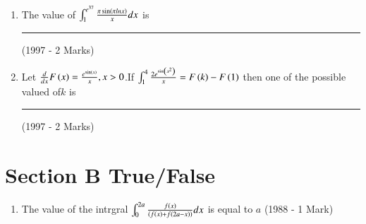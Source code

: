 \documentclass[journal,12pt,twocolumn]{IEEEtran}
\theoremstyle{remark}
\begin{document}
\begin{enumerate}
\item The value of $\int_1^{e^{37}} \frac {\pi \sin \left(\pi lnx\right)}{x} dx$ is \rule{1cm}{0.15mm}

	\hfill{(1997 - 2 Marks)}\\
		
\item Let $\frac {d}{dx}F\left(x\right)=\frac {e^{\sin\left(x\right)}}{x},x>0$.If $\int_1^4 \frac{2e^{\sin \left(x^2\right)}}{x}=F\left(k\right)-F\left(1\right)$ then one of the possible valued of$ k$ is \rule{1cm}{0.15mm}
\hfill{(1997 - 2 Marks)}\\
\end{enumerate}
\section{Section B True/False}
\begin{enumerate}
	\item The value of the intrgral $\int_0^{2a} \frac{f(x)}{\left(f\left(x\right)+f\left(2a-x\right)\right)}dx$ is equal to $a$
\hfill{(1988 - 1 Mark)}\\
\end{enumerate}
\end{document}
